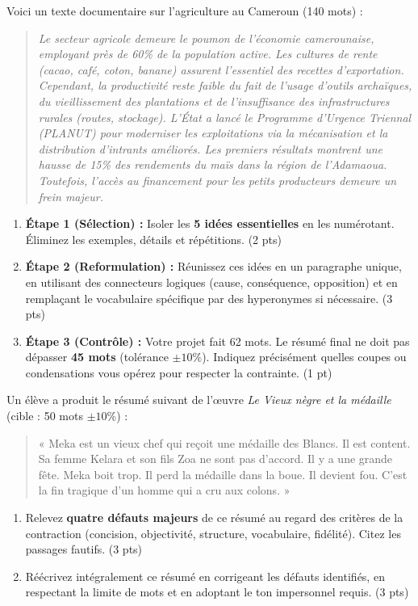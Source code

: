 \documentclass[11pt]{article}
\begin{document}
\begin{exercice}
Voici un texte documentaire sur l'agriculture au Cameroun (140 mots) :
\begin{quote}
\textit{Le secteur agricole demeure le poumon de l'économie camerounaise, employant près de 60\% de la population active. Les cultures de rente (cacao, café, coton, banane) assurent l'essentiel des recettes d'exportation. Cependant, la productivité reste faible du fait de l'usage d'outils archaïques, du vieillissement des plantations et de l'insuffisance des infrastructures rurales (routes, stockage). L'État a lancé le Programme d'Urgence Triennal (PLANUT) pour moderniser les exploitations via la mécanisation et la distribution d'intrants améliorés. Les premiers résultats montrent une hausse de 15\% des rendements du maïs dans la région de l'Adamaoua. Toutefois, l'accès au financement pour les petits producteurs demeure un frein majeur.}
\end{quote}
\begin{enumerate}
    \item \textbf{Étape 1 (Sélection) :} Isoler les \textbf{5 idées essentielles} en les numérotant. Éliminez les exemples, détails et répétitions. (2 pts)
    \item \textbf{Étape 2 (Reformulation) :} Réunissez ces idées en un paragraphe unique, en utilisant des connecteurs logiques (cause, conséquence, opposition) et en remplaçant le vocabulaire spécifique par des hyperonymes si nécessaire. (3 pts)
    \item \textbf{Étape 3 (Contrôle) :} Votre projet fait 62 mots. Le résumé final ne doit pas dépasser \textbf{45 mots} (tolérance $\pm 10\%$). Indiquez précisément quelles coupes ou condensations vous opérez pour respecter la contrainte. (1 pt)
\end{enumerate}
\end{exercice}

\begin{exercice}
Un élève a produit le résumé suivant de l'œuvre \textit{Le Vieux nègre et la médaille} (cible : 50 mots $\pm 10\%$) :
\begin{quote}
« Meka est un vieux chef qui reçoit une médaille des Blancs. Il est content. Sa femme Kelara et son fils Zoa ne sont pas d'accord. Il y a une grande fête. Meka boit trop. Il perd la médaille dans la boue. Il devient fou. C'est la fin tragique d'un homme qui a cru aux colons. »
\end{quote}
\begin{enumerate}
    \item Relevez \textbf{quatre défauts majeurs} de ce résumé au regard des critères de la contraction (concision, objectivité, structure, vocabulaire, fidélité). Citez les passages fautifs. (3 pts)
    \item Réécrivez intégralement ce résumé en corrigeant les défauts identifiés, en respectant la limite de mots et en adoptant le ton impersonnel requis. (3 pts)
\end{enumerate}
\end{exercice}
\end{document}
